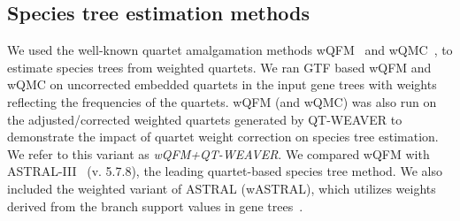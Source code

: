 \documentclass[runningheads]{llncs}
\begin{document}
\subsection{Species tree estimation methods}
\vspace{-3pt}
We used the well-known quartet amalgamation methods wQFM~\cite{wqfm} and wQMC~\cite{wqmc}, to estimate species trees from weighted quartets. 
We ran GTF based wQFM and wQMC on uncorrected embedded quartets in the input gene trees with weights reflecting the frequencies of the quartets. %
wQFM (and wQMC) was also run on the adjusted/corrected weighted quartets generated by QT-WEAVER to demonstrate the impact of quartet weight correction on species tree estimation. We refer to this variant as \textit{wQFM+QT-WEAVER}. We compared wQFM with ASTRAL-III~\cite{astral,zhang2018astral} (v. 5.7.8), the leading quartet-based species tree method. We also included the weighted variant of ASTRAL (wASTRAL), which utilizes weights derived from the branch support values in gene trees~\cite{zhang2022weighting}. 

\end{document}
